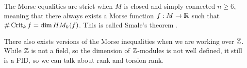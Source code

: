 
\begin{remark}
    The Morse equalities are strict when $M$ is closed and simply connected $n\ge 6$, meaning that there always exists a Morse function $f: M \to  \R$ such that $\# \Crit_k f = \dim \HMf[k]f$. This is called Smale's theorem \cite[p.~392]{smale2007generalized}.
\end{remark}
\begin{remark}
    There also exists versions of the Morse inequalities when we are working over $\Z$. While $\Z$ is not a field,
    so the dimension of $\Z$-modules is not well defined, it still is a PID, so we can talk about rank and torsion rank.
\end{remark}




